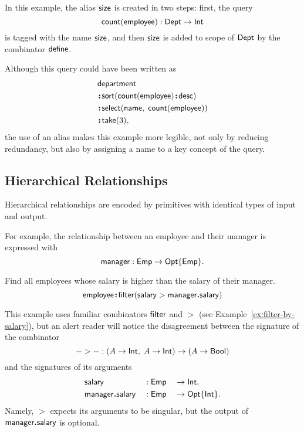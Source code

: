 In this example, the alias $\mathsf{size}$ is created in two steps: first, the query
\begin{equation*}
    \mathsf{count}(\mathsf{employee}): \mathsf{Dept} \to \mathsf{Int}
\end{equation*}
is tagged with the name $\mathsf{size}$, and then $\mathsf{size}$ is added to scope of $\mathsf{Dept}$
by the combinator $\mathsf{define}$.

Although this query could have been written as
\begin{align*}
    & \Department \\
    & \Apply\Sort(\Count(\Employee)\Apply\Desc) \\
    & \Apply\Select(\Name,\; \Count(\Employee)) \\
    & \Apply\Take(3),
\end{align*}
the use of an alias makes this example more legible, not only by reducing
redundancy, but also by assigning a name to a key concept of the query.

\subsection*{Hierarchical Relationships}

Hierarchical relationships are encoded by primitives with identical types of
input and output.

For example, the relationship between an employee and their manager is
expressed with
\begin{equation*}
    \mathsf{manager} : \mathsf{Emp} \to \mathsf{Opt}{\left\{\mathsf{Emp}\right\}}.
\end{equation*}

\begin{demo}
    \label{ex:employee-filter-salary-manager}
    Find all employees whose salary is higher than the salary of their manager.
    \begin{equation*}
        \mathsf{employee}\!\boldsymbol{:}\!\mathsf{filter}(\mathsf{salary}>\mathsf{manager}\boldsymbol{.}\mathsf{salary})
    \end{equation*}
\end{demo}

This example uses familiar combinators $\mathsf{filter}$ and ${>}$ (see
Example~\ref{ex:filter-by-salary}), but an alert reader will notice the
disagreement between the signature of the combinator
\begin{equation*}
    {-}>{-} : (A \to \mathsf{Int},\; A \to \mathsf{Int}) \to (A \to \mathsf{Bool})
\end{equation*}
and the signatures of its arguments
\begin{alignat*}{3}
    & \mathsf{salary} && : \mathsf{Emp} && \to \mathsf{Int}, \\
    & \mathsf{manager}\boldsymbol{.}\mathsf{salary} && : \mathsf{Emp} && \to \mathsf{Opt}{\left\{\mathsf{Int}\right\}}.
\end{alignat*}
Namely, ${>}$ expects its arguments to be singular, but the output of
$\mathsf{manager}\boldsymbol{.}\mathsf{salary}$ is optional.

